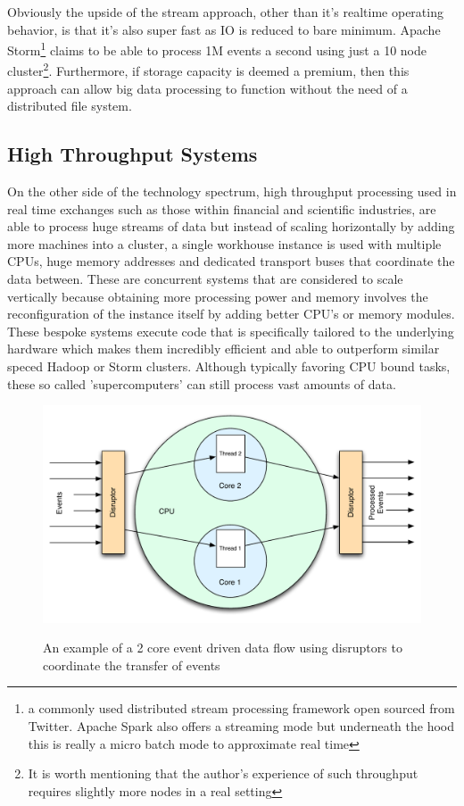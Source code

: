 \documentclass[a4paper,11pt]{scrreprt}
\begin{document}
Obviously the upside of the stream approach, other than it's realtime operating behavior, is that it's also super fast as IO is reduced to bare minimum. Apache Storm\cite{storm-site}\footnote{a commonly used distributed stream processing framework open sourced from Twitter\cite{storm-twitter}. Apache Spark also offers a streaming mode but underneath the hood this is really a micro batch mode to approximate real time\cite{spark-streaming-paper}} claims to be able to process 1M events a second using just a 10 node cluster\footnote{It is worth mentioning that the author's experience of such throughput requires slightly more nodes in a real setting}. Furthermore, if storage capacity is deemed a premium, then this approach can allow big data processing to function without the need of a distributed file system. 

\subsection{High Throughput Systems}
On the other side of the technology spectrum, high throughput processing used in real time exchanges such as those within financial and scientific industries, are able to process huge streams of data but instead of scaling horizontally by adding more machines into a cluster, a single workhouse instance is used with multiple CPUs, huge memory addresses and dedicated transport buses that coordinate the data between. These are concurrent systems that are considered to scale vertically because obtaining more processing power and memory involves the reconfiguration of the instance itself by adding better CPU's or memory modules. These bespoke systems execute code that is specifically tailored to the underlying hardware which makes them incredibly efficient and able to outperform similar speced Hadoop or Storm clusters. Although typically favoring CPU bound tasks, these so called 'supercomputers' can still process vast amounts of data.
\begin{figure}[h!]

\centering
\caption{An example of a 2 core event driven data flow using disruptors to coordinate the transfer of events}
\includegraphics[scale=0.65] {disruptor-ex.pdf}
\label{fig:disruptor-ex}
\end{figure}
\end{document}
